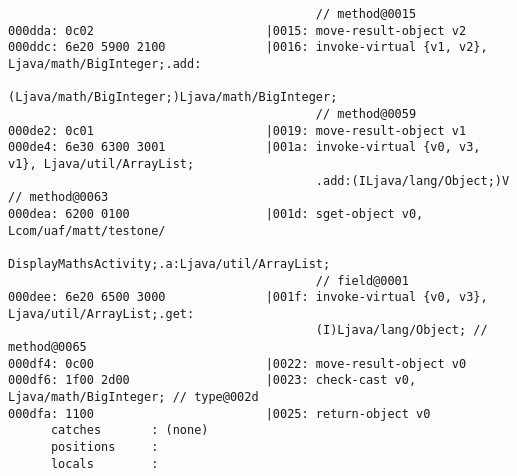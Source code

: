 \begin{lstlisting}
                                           // method@0015
000dda: 0c02                        |0015: move-result-object v2
000ddc: 6e20 5900 2100              |0016: invoke-virtual {v1, v2}, Ljava/math/BigInteger;.add:
                                           (Ljava/math/BigInteger;)Ljava/math/BigInteger;
                                           // method@0059
000de2: 0c01                        |0019: move-result-object v1
000de4: 6e30 6300 3001              |001a: invoke-virtual {v0, v3, v1}, Ljava/util/ArrayList;
                                           .add:(ILjava/lang/Object;)V // method@0063
000dea: 6200 0100                   |001d: sget-object v0, Lcom/uaf/matt/testone/
                                           DisplayMathsActivity;.a:Ljava/util/ArrayList;
                                           // field@0001
000dee: 6e20 6500 3000              |001f: invoke-virtual {v0, v3}, Ljava/util/ArrayList;.get:
                                           (I)Ljava/lang/Object; // method@0065
000df4: 0c00                        |0022: move-result-object v0
000df6: 1f00 2d00                   |0023: check-cast v0, Ljava/math/BigInteger; // type@002d
000dfa: 1100                        |0025: return-object v0
      catches       : (none)
      positions     :
      locals        :


\end{lstlisting}

